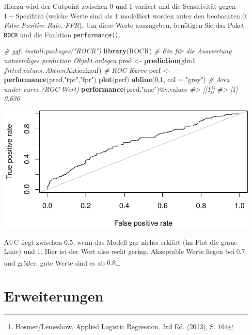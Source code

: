 \documentclass[12pt,]{book}
\newenvironment{Shaded}{\begin{snugshade}}{\end{snugshade}}
\newcommand{\KeywordTok}[1]{\textcolor[rgb]{0.13,0.29,0.53}{\textbf{{#1}}}}
\newcommand{\DataTypeTok}[1]{\textcolor[rgb]{0.13,0.29,0.53}{{#1}}}
\newcommand{\DecValTok}[1]{\textcolor[rgb]{0.00,0.00,0.81}{{#1}}}
\newcommand{\StringTok}[1]{\textcolor[rgb]{0.31,0.60,0.02}{{#1}}}
\newcommand{\CommentTok}[1]{\textcolor[rgb]{0.56,0.35,0.01}{\textit{{#1}}}}
\newcommand{\NormalTok}[1]{{#1}}
\let\rmarkdownfootnote\footnote%
\def\footnote{\protect\rmarkdownfootnote}
\begin{document}
Hierzu wird der Cutpoint zwischen 0 und 1 variiert und die Sensitivität
gegen \(1-\)Spezifität (welche Werte sind als \(1\) modelliert worden
unter den beobachten \(0\), \emph{False Positive Rate, FPR}). Um diese
Werte auszugeben, benötigen Sie das Paket \texttt{ROCR} und die Funktion
\texttt{performance()}.

\begin{Shaded}
\begin{Highlighting}[]
\CommentTok{# ggf. install.packages("ROCR")}
\KeywordTok{library}\NormalTok{(ROCR)}
\CommentTok{# Ein für die Auswertung notwendiges prediction Objekt anlegen}
\NormalTok{pred <-}\StringTok{ }\KeywordTok{prediction}\NormalTok{(glm1$fitted.values, Aktien$Aktienkauf)}
\CommentTok{# ROC Kurve}
\NormalTok{perf <-}\StringTok{ }\KeywordTok{performance}\NormalTok{(pred,}\StringTok{"tpr"}\NormalTok{,}\StringTok{"fpr"}\NormalTok{)}
\KeywordTok{plot}\NormalTok{(perf)}
\KeywordTok{abline}\NormalTok{(}\DecValTok{0}\NormalTok{,}\DecValTok{1}\NormalTok{, }\DataTypeTok{col =} \StringTok{"grey"}\NormalTok{)}
\CommentTok{# Area under curve (ROC-Wert)}
\KeywordTok{performance}\NormalTok{(pred,}\StringTok{"auc"}\NormalTok{)@y.values}
\CommentTok{#> [[1]]}
\CommentTok{#> [1] 0.636}
\end{Highlighting}
\end{Shaded}

\begin{center}\includegraphics[width=0.7\linewidth]{072_klassifizierende_Regression_files/figure-latex/unnamed-chunk-15-1} \end{center}

AUC liegt zwischen \(0.5\), wenn das Modell gar nichts erklärt (im Plot
die graue Linie) und \(1\). Hier ist der Wert also recht gering.
Akzeptable Werte liegen bei \(0.7\) und größer, gute Werte sind es ab
\(0.8\).\footnote{Hosmer/Lemeshow, Applied Logistic Regression, 3rd Ed.
  (2013), S. 164}

\section{Erweiterungen}\label{erweiterungen}
\end{document}
